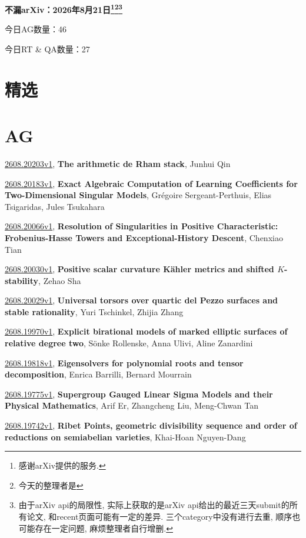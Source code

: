 \documentclass[9pt, a4paper]{article}
\theoremstyle{plain}
\theoremstyle{definition}
\theoremstyle{remark}
\newcommand{\arxiv}[3]{\href{https://arxiv.org/abs/#1}{#1}, \textbf{\textcolor{arxivblue}{#2}}, #3}
\newcommand{\AGnumber}{46}
\newcommand{\RTQAnumber}{27}
\newcommand{\NewestDate}{2026年8月21日}
\newcommand{\todayarXiver}{} %
\begin{document}
\begin{center}
    \Huge\textbf{不漏arXiv：\NewestDate\footnote{感谢arXiv提供的服务.}\footnote{今天的整理者是\todayarXiver}\footnote{由于arXiv api的局限性, 实际上获取的是arXiv api给出的最近三天submit的所有论文, 和recent页面可能有一定的差异. 三个category中没有进行去重, 顺序也可能存在一定问题, 麻烦整理者自行增删.}} \\
\end{center}

\setcounter{section}{-1}

\begin{center}
    今日AG数量：\AGnumber
    
    今日RT \& QA数量：\RTQAnumber
    
\end{center}


\section{精选}


\section{AG}
\arxiv{2608.20203v1}{The arithmetic de Rham stack}{Junhui Qin}

\arxiv{2608.20183v1}{Exact Algebraic Computation of Learning Coefficients for Two-Dimensional Singular Models}{Grégoire Sergeant-Perthuis, Elias Tsigaridas, Jules Tsukahara}

\arxiv{2608.20066v1}{Resolution of Singularities in Positive Characteristic: Frobenius-Hasse Towers and Exceptional-History Descent}{Chenxiao Tian}

\arxiv{2608.20030v1}{Positive scalar curvature Kähler metrics and shifted $K$-stability}{Zehao Sha}

\arxiv{2608.20029v1}{Universal torsors over quartic del Pezzo surfaces and stable rationality}{Yuri Tschinkel, Zhijia Zhang}

\arxiv{2608.19970v1}{Explicit birational models of marked elliptic surfaces of relative degree two}{Sönke Rollenske, Anna Ulivi, Aline Zanardini}

\arxiv{2608.19818v1}{Eigensolvers for polynomial roots and tensor decomposition}{Enrica Barrilli, Bernard Mourrain}

\arxiv{2608.19775v1}{Supergroup Gauged Linear Sigma Models and their Physical Mathematics}{Arif Er, Zhangcheng Liu, Meng-Chwan Tan}

\arxiv{2608.19742v1}{Ribet Points, geometric divisibility sequence and order of reductions on semiabelian varieties}{Khai-Hoan Nguyen-Dang}
\end{document}
